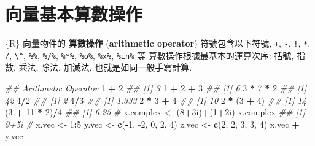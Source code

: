 \documentclass[
]{book}
\newenvironment{Shaded}{\begin{snugshade}}{\end{snugshade}}
\newcommand{\CommentTok}[1]{\textcolor[rgb]{0.56,0.35,0.01}{\textit{#1}}}
\newcommand{\DecValTok}[1]{\textcolor[rgb]{0.00,0.00,0.81}{#1}}
\newcommand{\KeywordTok}[1]{\textcolor[rgb]{0.13,0.29,0.53}{\textbf{#1}}}
\newcommand{\NormalTok}[1]{#1}
\newcommand{\OperatorTok}[1]{\textcolor[rgb]{0.81,0.36,0.00}{\textbf{#1}}}
\newcommand{\StringTok}[1]{\textcolor[rgb]{0.31,0.60,0.02}{#1}}
\begin{document}
\hypertarget{ux5411ux91cfux57faux672cux7b97ux6578ux64cdux4f5c}{%
\section{向量基本算數操作}\label{ux5411ux91cfux57faux672cux7b97ux6578ux64cdux4f5c}}

\{R\} 向量物件的
\textbf{算數操作}
(\textbf{arithmetic operator})
符號包含以下符號,
\texttt{+}, \texttt{-}, \texttt{!}, \texttt{*}, \texttt{/}, \texttt{\textbackslash{}\^{}}, \texttt{\%\%}, \texttt{\%/\%}, \texttt{\%*\%}, \texttt{\%o\%}, \texttt{\%x\%}, \texttt{\%in\%} 等
算數操作根據最基本的運算次序:
括號, 指數, 乘法, 除法, 加減法, 也就是如同一般手寫計算.

\begin{Shaded}
\begin{Highlighting}[]
\CommentTok{\#\# Arithmetic Operator}
\DecValTok{1} \OperatorTok{+}\StringTok{ }\DecValTok{2}
\CommentTok{\#\# [1] 3}
\DecValTok{1} \OperatorTok{+}\StringTok{ }\DecValTok{2} \OperatorTok{+}\StringTok{ }\DecValTok{3}
\CommentTok{\#\# [1] 6}
\DecValTok{3} \OperatorTok{*}\StringTok{ }\DecValTok{7} \OperatorTok{*}\StringTok{ }\DecValTok{2}
\CommentTok{\#\# [1] 42}
\DecValTok{4}\OperatorTok{/}\DecValTok{2}
\CommentTok{\#\# [1] 2}
\DecValTok{4}\OperatorTok{/}\DecValTok{3}
\CommentTok{\#\# [1] 1.333}
\DecValTok{2} \OperatorTok{*}\StringTok{ }\DecValTok{3} \OperatorTok{+}\StringTok{ }\DecValTok{4}
\CommentTok{\#\# [1] 10}
\DecValTok{2} \OperatorTok{*}\StringTok{ }\NormalTok{(}\DecValTok{3} \OperatorTok{+}\StringTok{ }\DecValTok{4}\NormalTok{)}
\CommentTok{\#\# [1] 14}
\NormalTok{(}\DecValTok{3} \OperatorTok{+}\StringTok{ }\DecValTok{11} \OperatorTok{*}\StringTok{ }\DecValTok{2}\NormalTok{)}\OperatorTok{/}\DecValTok{4}
\CommentTok{\#\# [1] 6.25}
\CommentTok{\#}
\NormalTok{x.complex \textless{}{-}}\StringTok{ }\NormalTok{(}\DecValTok{8}\OperatorTok{+}\NormalTok{3i)}\OperatorTok{+}\NormalTok{(}\DecValTok{1}\OperatorTok{+}\NormalTok{2i)}
\NormalTok{x.complex}
\CommentTok{\#\# [1] 9+5i}
\CommentTok{\#}
\NormalTok{x.vec \textless{}{-}}\StringTok{ }\DecValTok{1}\OperatorTok{:}\DecValTok{5}
\NormalTok{y.vec \textless{}{-}}\StringTok{ }\KeywordTok{c}\NormalTok{(}\OperatorTok{{-}}\DecValTok{1}\NormalTok{, }\DecValTok{{-}2}\NormalTok{, }\DecValTok{0}\NormalTok{, }\DecValTok{2}\NormalTok{, }\DecValTok{4}\NormalTok{)}
\NormalTok{z.vec \textless{}{-}}\StringTok{ }\KeywordTok{c}\NormalTok{(}\DecValTok{2}\NormalTok{, }\DecValTok{2}\NormalTok{, }\DecValTok{3}\NormalTok{, }\DecValTok{3}\NormalTok{, }\DecValTok{4}\NormalTok{)}
\NormalTok{x.vec }\OperatorTok{+}\StringTok{ }\NormalTok{y.vec}

\end{Highlighting}
\end{Shaded}
\end{document}
